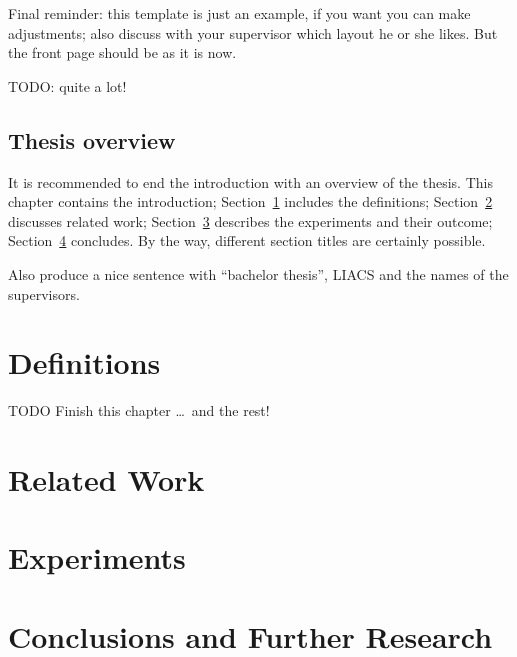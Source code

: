 \documentclass[12pt]{article}
\begin{document}
Final reminder: this template is just an example, if you want you can make adjustments; also discuss with your supervisor which layout he or she likes. But the front page should be as it is now.

TODO: quite a lot!

\subsection{Thesis overview}
It is recommended to end the introduction with an overview of the thesis. This chapter contains the introduction; Section~\ref{definitions} includes the definitions; Section~\ref{relatedwork} discusses related work; Section~\ref{experiments} describes the experiments and their outcome; Section~\ref{conclusions} concludes. By the way, different section titles are certainly possible.

Also produce a nice sentence with ``bachelor thesis'', LIACS and the names of the supervisors.




\section{Definitions}\label{definitions}

TODO Finish this chapter \ldots\ and the rest!

\section{Related Work}\label{relatedwork}

\section{Experiments}\label{experiments}

\section{Conclusions and Further Research}\label{conclusions}





\end{document}
